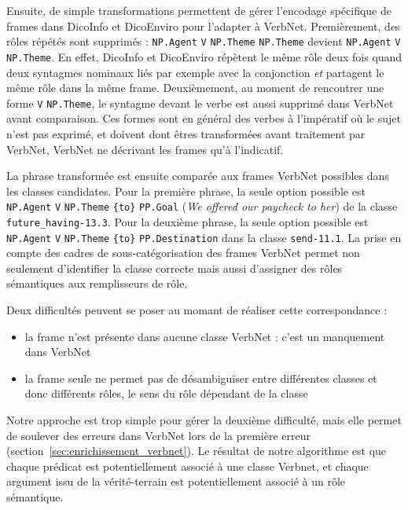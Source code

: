 Ensuite, de simple transformations permettent de gérer l'encodage spécifique de
frames dans DicoInfo et DicoEnviro pour l'adapter à VerbNet. Premièrement, des
rôles répétés sont supprimés : \texttt{NP.Agent} \texttt{V} \texttt{NP.Theme}
\texttt{NP.Theme} devient \texttt{NP.Agent} \texttt{V} \texttt{NP.Theme}. En
effet, DicoInfo et DicoEnviro répètent le même rôle deux fois quand deux
syntagmes nominaux liés par exemple avec la conjonction \emph{et} partagent le
même rôle dans la même frame. Deuxièmement, au moment de rencontrer une forme
\texttt{V} \texttt{NP.Theme}, le syntagme devant le verbe est aussi supprimé
dans VerbNet avant comparaison. Ces formes sont en général des verbes à
l'impératif où le sujet n'est pas exprimé, et doivent dont êtres transformées
avant traitement par VerbNet, VerbNet ne décrivant les frames qu'à l'indicatif.

La phrase transformée est ensuite comparée aux frames VerbNet possibles dans
les classes candidates. Pour la première phrase, la seule option possible est
\texttt{NP.Agent} \texttt{V} \texttt{NP.Theme} \texttt{\{to\}} \texttt{PP.Goal}
(\textit{We offered our paycheck to her}) de la classe
\texttt{future\_having-13.3}. Pour la deuxième phrase, la seule option possible
est \texttt{NP.Agent} \texttt{V} \texttt{NP.Theme} \texttt{\{to\}}
\texttt{PP.Destination} dans la classe \texttt{send-11.1}. La prise en compte
des cadres de sous-catégorisation des frames VerbNet permet non seulement
d'identifier la classe correcte mais aussi d'assigner des rôles sémantiques aux
remplisseurs de rôle.

Deux difficultés peuvent se poser au momant de réaliser cette correspondance :
\begin{itemize}

    \item la frame n'est présente dans aucune classe VerbNet : c'est un
        manquement dans VerbNet

    \item la frame seule ne permet pas de désambiguïser entre différentes
        classes et donc différents rôles, le sens du rôle dépendant de la
        classe

\end{itemize}
        
Notre approche est trop simple pour gérer la deuxième difficulté, mais elle
permet de soulever des erreurs dans VerbNet lors de la première erreur
(section~\ref{sec:enrichissement_verbnet}). Le résultat de notre algorithme
est que chaque prédicat est potentiellement associé à une classe Verbnet, et
chaque argument issu de la vérité-terrain est potentiellement associé à un rôle
sémantique.

